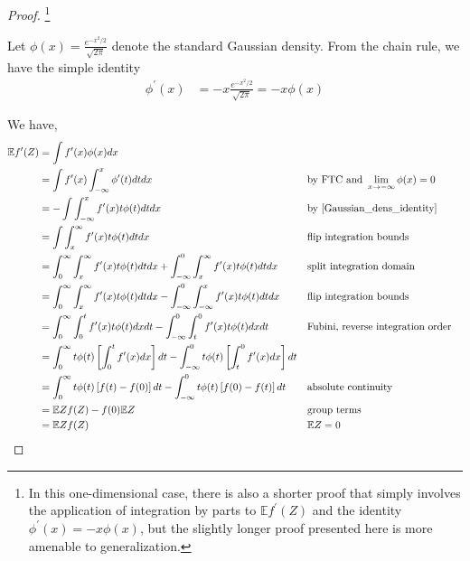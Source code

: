 \documentclass[12pt]{article}
\newcommand{\E}{\mathbb{E}}
\newcommand{\GaussianDens}{\phi}
\begin{document}
\begin{proof} \footnote{In this one-dimensional case, there is also a shorter proof that simply involves the application 
				   of integration by parts to $\E f^\prime(Z)$ and the identity $\GaussianDens^\prime(x) = -x \GaussianDens(x)$, but the slightly
				   longer proof presented here is more amenable to generalization.}

Let $\GaussianDens(x) = \frac{e^{-x^2/2}}{\sqrt{2\pi}}$ denote the standard Gaussian density. From the chain rule, we have the simple identity 
\begin{align}
\GaussianDens^\prime(x) &= -x \frac{e^{-x^2/2}}{\sqrt{2\pi}} = -x \GaussianDens(x) \label{Gaussian_dens_identity}
\end{align}

We have, 
\begin{align*}
\E f^\prime(Z) 
&= \int f^\prime(x) \GaussianDens(x) dx \\
&= \int f^\prime(x) \int_{-\infty}^{x} \GaussianDens^\prime(t) dt dx &&\text{by FTC and } \lim_{x \to -\infty} \GaussianDens(x) = 0 \\
&= -\int \int_{-\infty}^{x} f^\prime(x) t \GaussianDens(t) dt dx 	   &&\text{by \ref{Gaussian_dens_identity}} \\
&= \int \int_{x}^{\infty} f^\prime(x) t \GaussianDens(t) dt dx		   &&\text{flip integration bounds} \\
&= \int_{0}^{\infty} \int_{x}^{\infty} f^\prime(x) t \GaussianDens(t) dt dx + \int_{-\infty}^{0} \int_{x}^{\infty} f^\prime(x) t \GaussianDens(t) dt dx &&\text{split integration domain} \\
&= \int_{0}^{\infty} \int_{x}^{\infty} f^\prime(x) t \GaussianDens(t) dt dx - \int_{-\infty}^{0} \int_{-\infty}^{x} f^\prime(x) t \GaussianDens(t) dt dx &&\text{flip integration bounds} \\
&= \int_{0}^{\infty} \int_{0}^{t} f^\prime(x) t \GaussianDens(t) dx dt - \int_{-\infty}^{0} \int_{t}^{0} f^\prime(x) t \GaussianDens(t) dx dt &&\text{Fubini, reverse integration order} \\
&= \int_{0}^{\infty} t \GaussianDens(t) \left[\int_{0}^{t} f^\prime(x) dx \right] dt - \int_{-\infty}^{0}  t \GaussianDens(t) \left[\int_{t}^{0} f^\prime(x)  dx\right] dt \\
&= \int_{0}^{\infty} t \GaussianDens(t) \left[f(t) - f(0) \right] dt - \int_{-\infty}^{0}  t \GaussianDens(t) \left[f(0) - f(t) \right] dt && \text{absolute continuity} \\
&= \E Z f(Z) - f(0) \E Z &&\text{group terms} \\
&= \E Z f(Z) &&\E Z = 0
\end{align*}

\end{proof} 
\end{document}
